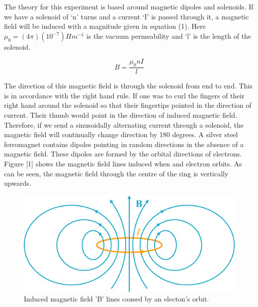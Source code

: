 \documentclass[a4paper]{article}\usepackage[english]{babel}
\begin{document}
The theory for this experiment is based around magnetic dipoles and solenoids. If we have a solenoid of ‘n’ turns and a current ‘I’ is passed through it, a magnetic field will be induced with a magnitude given in equation (1). Here $\mu_0=(4\pi)(10^{-7})Hm^{-1}$ is the vacuum permeability and ‘l’ is the length of the solenoid.

\begin{equation}\label{my_first_equation}
B= \frac{\mu_0nI}{l}
\end{equation}

The direction of this magnetic field is through the solenoid from end to end. This is in accordance with the right hand rule. If one was to curl the fingers of their right hand around the solenoid so that their fingertips pointed in the direction of current. Their thumb would point in the direction of induced magnetic field. Therefore, if we send a sinusoidally alternating current through a solenoid, the magnetic field will continually change direction by 180 degrees.
A silver steel ferromagnet contains dipoles pointing in random directions in the absence of a magnetic field. These dipoles are formed by the orbital directions of electrons. Figure [1] shows the magnetic field lines induced when and electron orbits. As can be seen, the magnetic field through the centre of the ring is vertically upwards.

\begin{figure}[!ht]
\includegraphics[width=\linewidth]{picture_1.jpg}
\caption{\label{fig:picture_1}Induced magnetic field 'B' lines caused by an electon’s orbit.}
\end{figure}
\end{document}
